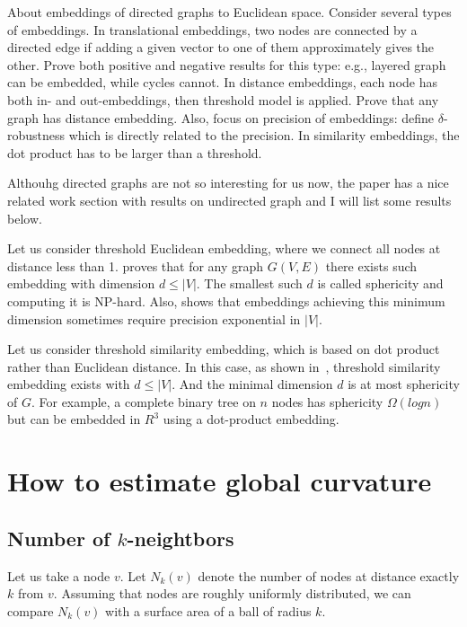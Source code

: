 \documentclass{article}
\begin{document}
About embeddings of directed graphs to Euclidean space. Consider several types of embeddings. In translational embeddings, two nodes are connected by a directed edge if adding a given vector to one of them approximately gives the other. Prove both positive and negative results for this type: e.g., layered graph can be embedded, while cycles cannot. In distance embeddings, each node has both in- and out-embeddings, then threshold model is applied. Prove that any graph has distance embedding. Also, focus on precision of embeddings: define $\delta$-robustness which is directly related to the precision. In similarity embeddings, the dot product has to be larger than a threshold.

Althouhg directed graphs are not so interesting for us now, the paper has a nice related work section with results on undirected graph and I will list some results below. 

Let us consider threshold Euclidean embedding, where we connect all nodes at distance less than 1. \cite{maehara1984space} proves that for any graph $G(V,E)$ there exists such embedding with dimension $d \le |V|$. The smallest such $d$ is called sphericity and computing it is NP-hard. Also, \cite{kang2012sphere} shows that embeddings achieving this minimum dimension sometimes require precision exponential in $|V|$.

Let us consider threshold similarity embedding, which is based on dot product rather than Euclidean distance. In this case, as shown in~\cite{reiterman1989geometrical}, threshold similarity embedding exists with $d \le |V|$. And the minimal dimension $d$ is at most sphericity of $G$. For example, a complete binary tree on $n$ nodes has sphericity $\Omega(log n)$ but can be embedded in $R^3$ using a dot-product embedding.

\section{How to estimate global curvature}

\subsection{Number of $k$-neightbors}

Let us take a node $v$. Let $N_k(v)$ denote the number of nodes at distance exactly $k$ from $v$. Assuming that nodes are roughly uniformly distributed, we can compare $N_k(v)$ with a surface area of a ball of radius $k$. 
\end{document}
